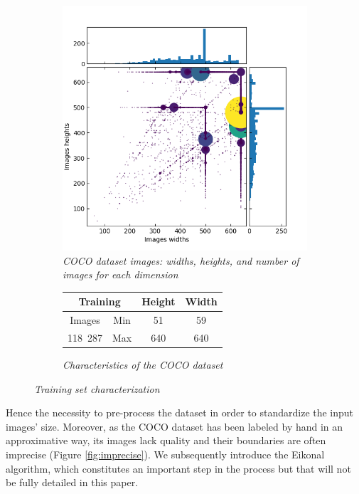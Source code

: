 \documentclass{article}
\begin{document}
        \begin{figure}[!ht]
            \begin{subfigure}{.49\linewidth}
                \centering
                \includegraphics[width=\linewidth]{pics/train2017full.png}
                \caption{\textit{COCO dataset images: widths, heights, and number of images for each dimension}}
            \end{subfigure}
            \begin{subfigure}{.49\linewidth}
                \center
                \begin{tabular}{|c||c|c|c|}
                    \hline
                    \multicolumn{2}{|c|}{Training} & Height & Width \\
                    \hline
                    \hline
                    Images & Min & 51 & 59 \\
                    \hline
                    118~287 & Max & 640 & 640 \\
                    \hline
                \end{tabular}
                \caption{\textit{Characteristics of the COCO dataset}}
            \end{subfigure}
            \caption{\textit{Training set characterization}}
        \end{figure}
        Hence the necessity to pre-process the dataset in order to standardize the input images' size. Moreover, as the COCO dataset has been labeled by hand in an approximative way, its images lack quality and their boundaries are often imprecise (Figure \ref{fig:imprecise}). We subsequently introduce the Eikonal algorithm, which constitutes an important step in the process but that will not be fully detailed in this paper.
\end{document}
